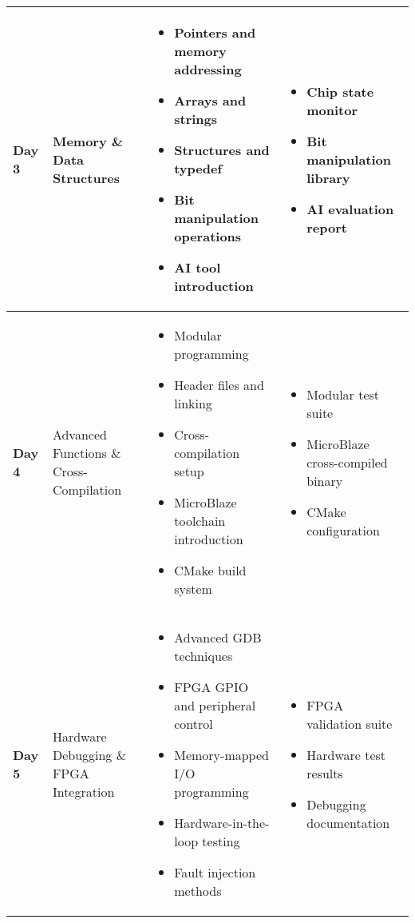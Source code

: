 \documentclass[11pt,a4paper]{article}
\begin{document}
\begin{longtable}{|p{1.5cm}|p{4cm}|p{6cm}|p{3cm}|}
\textbf{Day 3} & Memory \& Data Structures &
\begin{itemize}[nosep]
    \item Pointers and memory addressing
    \item Arrays and strings
    \item Structures and typedef
    \item Bit manipulation operations
    \item AI tool introduction
\end{itemize} &
\begin{itemize}[nosep]
    \item Chip state monitor
    \item Bit manipulation library
    \item AI evaluation report
\end{itemize} \\
\hline

\textbf{Day 4} & Advanced Functions \& Cross-Compilation &
\begin{itemize}[nosep]
    \item Modular programming
    \item Header files and linking
    \item Cross-compilation setup
    \item MicroBlaze toolchain introduction
    \item CMake build system
\end{itemize} &
\begin{itemize}[nosep]
    \item Modular test suite
    \item MicroBlaze cross-compiled binary
    \item CMake configuration
\end{itemize} \\
\hline

\textbf{Day 5} & Hardware Debugging \& FPGA Integration &
\begin{itemize}[nosep]
    \item Advanced GDB techniques
    \item FPGA GPIO and peripheral control
    \item Memory-mapped I/O programming
    \item Hardware-in-the-loop testing
    \item Fault injection methods
\end{itemize} &
\begin{itemize}[nosep]
    \item FPGA validation suite
    \item Hardware test results
    \item Debugging documentation
\end{itemize} \\
\hline


\end{longtable}
\end{document}
